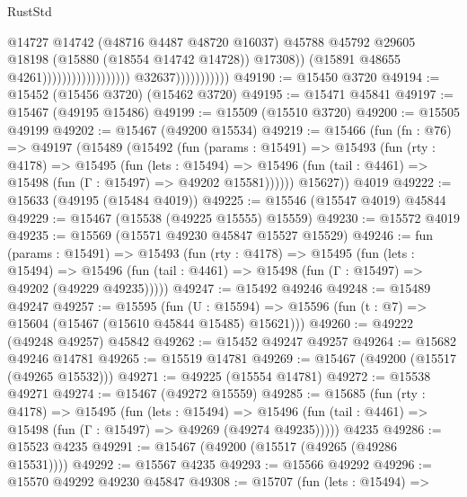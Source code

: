 \begin{lexlean}{RustStd}
\begin{coremodule}
                                                                @14727
                                                                @14742
                                                                (@48716 @4487 @48720 @16037)
                                                                @45788
                                                                @45792
                                                                @29605
                                                                @18198
                                                                (@15880 (@18554 @14742 @14728))
                                                                @17308))
                                                            (@15891 @48655 @4261))))))))))))))))))
                          @32637)))))))))))
@49190 := @15450 @3720
@49194 := @15452 (@15456 @3720) (@15462 @3720)
@49195 := @15471 @45841
@49197 := @15467 (@49195 @15486)
@49199 := @15509 (@15510 @3720)
@49200 := @15505 @49199
@49202 := @15467 (@49200 @15534)
@49219 := @15466
    (fun (fn : @76) =>
    @49197
      (@15489
        (@15492
          (fun (params : @15491) =>
          @15493
            (fun (rty : @4178) =>
            @15495
              (fun (lets : @15494) =>
              @15496 (fun (tail : @4461) => @15498 (fun (Γ : @15497) => @49202 @15581))))))
        @15627))
    @4019
@49222 := @15633 (@49195 (@15484 @4019))
@49225 := @15546 (@15547 @4019) @45844
@49229 := @15467 (@15538 (@49225 @15555) @15559)
@49230 := @15572 @4019
@49235 := @15569 (@15571 @49230 @45847 @15527 @15529)
@49246 := fun (params : @15491) =>
  @15493
    (fun (rty : @4178) =>
    @15495
      (fun (lets : @15494) =>
      @15496 (fun (tail : @4461) => @15498 (fun (Γ : @15497) => @49202 (@49229 @49235)))))
@49247 := @15492 @49246
@49248 := @15489 @49247
@49257 := @15595
    (fun (U : @15594) => @15596 (fun (t : @7) => @15604 (@15467 (@15610 @45844 @15485) @15621)))
@49260 := @49222 (@49248 @49257) @45842
@49262 := @15452 @49247 @49257
@49264 := @15682 @49246 @14781
@49265 := @15519 @14781
@49269 := @15467 (@49200 (@15517 (@49265 @15532)))
@49271 := @49225 (@15554 @14781)
@49272 := @15538 @49271
@49274 := @15467 (@49272 @15559)
@49285 := @15685
    (fun (rty : @4178) =>
    @15495
      (fun (lets : @15494) =>
      @15496 (fun (tail : @4461) => @15498 (fun (Γ : @15497) => @49269 (@49274 @49235)))))
    @4235
@49286 := @15523 @4235
@49291 := @15467 (@49200 (@15517 (@49265 (@49286 @15531))))
@49292 := @15567 @4235
@49293 := @15566 @49292
@49296 := @15570 @49292 @49230 @45847
@49308 := @15707
    (fun (lets : @15494) =>

\end{coremodule}
\end{lexlean}
